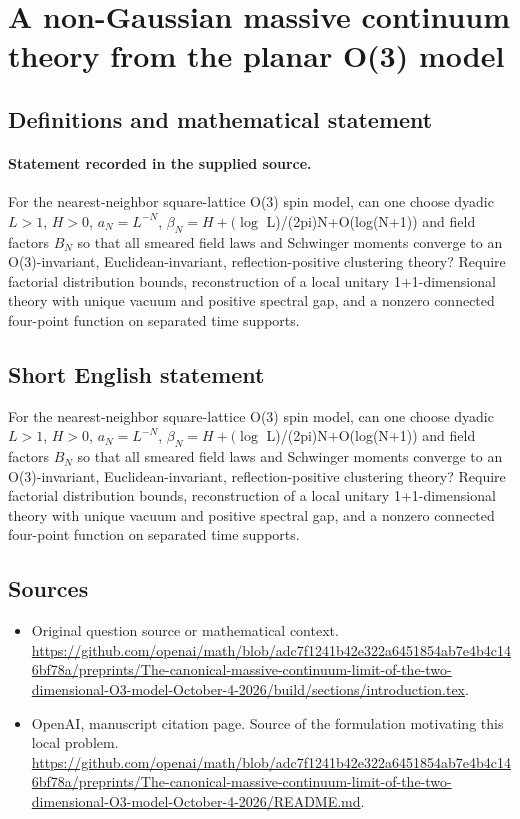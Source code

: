 \documentclass[11pt]{article}
\begin{document}
\section*{A non-Gaussian massive continuum theory from the planar O(3) model}\label{statement}
\subsection{Definitions and mathematical statement}
\paragraph{Statement recorded in the supplied source.}
For the nearest-neighbor square-lattice O(3) spin model, can one choose dyadic $L>1$, $H>0$, $a_N=L^{-N}$, $\beta _N=H+(\log $ L)/(2pi)N+O(log(N+1)) and field factors $B_N$ so that all smeared field laws and Schwinger moments converge to an O(3)-invariant, Euclidean-invariant, reflection-positive clustering theory? Require factorial distribution bounds, reconstruction of a local unitary 1+1-dimensional theory with unique vacuum and positive spectral gap, and a nonzero connected four-point function on separated time supports.
\subsection{Short English statement}
For the nearest-neighbor square-lattice O(3) spin model, can one choose dyadic $L>1$, $H>0$, $a_N=L^{-N}$, $\beta _N=H+(\log $ L)/(2pi)N+O(log(N+1)) and field factors $B_N$ so that all smeared field laws and Schwinger moments converge to an O(3)-invariant, Euclidean-invariant, reflection-positive clustering theory? Require factorial distribution bounds, reconstruction of a local unitary 1+1-dimensional theory with unique vacuum and positive spectral gap, and a nonzero connected four-point function on separated time supports.
\subsection{Sources}
\begin{itemize}
\item[S1] Original question source or mathematical context.
\url{https://github.com/openai/math/blob/adc7f1241b42e322a6451854ab7e4b4c146bf78a/preprints/The-canonical-massive-continuum-limit-of-the-two-dimensional-O3-model-October-4-2026/build/sections/introduction.tex}.
\item[S2] OpenAI, manuscript citation page. Source of the formulation motivating this local problem.
\url{https://github.com/openai/math/blob/adc7f1241b42e322a6451854ab7e4b4c146bf78a/preprints/The-canonical-massive-continuum-limit-of-the-two-dimensional-O3-model-October-4-2026/README.md}.
\end{itemize}
\end{document}
